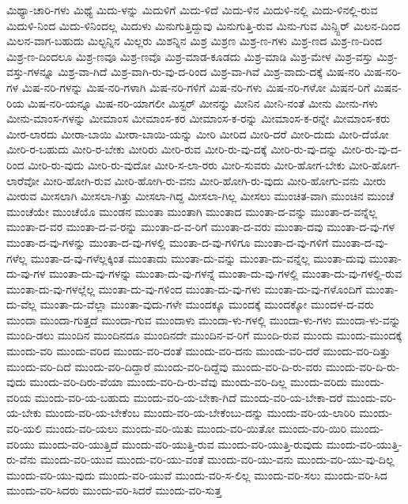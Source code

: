 {ಮಿಥ್ಯಾ-ಚಾರಿ-ಗಳು
ಮಿಥ್ಯೆ
ಮಿದು-ಳನ್ನು
ಮಿದುಳಿಗೆ
ಮಿದು-ಳಿದೆ
ಮಿದು-ಳಿನ
ಮಿದುಳಿ-ನಲ್ಲಿ
ಮಿದು-ಳಿನಲ್ಲಿ-ರುವ
ಮಿದುಳಿ-ನಿಂದ
ಮಿದು-ಳಿನಿಂದಲ್ಲ
ಮಿದುಳು
ಮಿನುಗುತ್ತಿದ್ದುವು
ಮಿನುಗುತ್ತಿ-ರುವ
ಮಿನು-ಗುವ
ಮಿನ್ಸ್ಟಿರ್
ಮಿಲನ-ದಿಂದ
ಮಿಲನ-ವಾಗ-ಬಹುದು
ಮಿಲ್ಟನ್ನಿನ
ಮಿಲ್ಲರು
ಮಿಶನ್ನಿನ
ಮಿಶ್ರ
ಮಿಶ್ರಣ
ಮಿಶ್ರ-ಣ-ಗಳು
ಮಿಶ್ರ-ಣದ
ಮಿಶ್ರ-ಣ-ದಿಂದ
ಮಿಶ್ರ-ಣ-ದಿಂದಲೂ
ಮಿಶ್ರ-ಣವೂ
ಮಿಶ್ರ-ಣವೊ
ಮಿಶ್ರ-ಮಾಡ-ಕೂಡದು
ಮಿಶ್ರ-ಮಾಡಿ
ಮಿಶ್ರ-ಮೇಳ
ಮಿಶ್ರ-ವಸ್ತು
ಮಿಶ್ರ-ವಸ್ತು-ಗಳನ್ನೂ
ಮಿಶ್ರ-ವಾ-ಗಿದೆ
ಮಿಶ್ರ-ವಾಗಿ-ರು-ವು-ದ-ರಿಂದ
ಮಿಶ್ರ-ವಾ-ಗಿವೆ
ಮಿಶ್ರ-ವಾದು-ದಕ್ಕೆ
ಮಿಷ-ನರಿ
ಮಿಷ-ನರಿ-ಗಳ
ಮಿಷ-ನರಿ-ಗಳನ್ನು
ಮಿಷ-ನರಿ-ಗಳಾಗಿ
ಮಿಷ-ನರಿ-ಗಳಿಗೆ
ಮಿಷ-ನರಿ-ಗಳು
ಮಿಷ-ನರಿ-ಗಳೋ
ಮಿಷನ-ರಿಗೆ
ಮಿಷನ-ರಿಯ
ಮಿಷ-ನರಿ-ಯನ್ನೂ
ಮಿಷ-ನರಿ-ಯಾಗಲೀ
ಮಿಸ್ಟರ್
ಮೀನನ್ನು
ಮೀನಿನ
ಮೀನಿ-ನಂತೆ
ಮೀನು
ಮೀನು-ಗಳು
ಮೀನು-ಮಾಂಸ-ಗಳನ್ನು
ಮೀಮಾಂಸ
ಮೀಮಾಂಸ-ಕರ
ಮೀಮಾಂಸ-ಕ-ರನ್ನು
ಮೀಮಾಂಸ-ಕ-ರನ್ನೇ
ಮೀಮಾಂಸ-ಕರು
ಮೀರ-ಲಾರದು
ಮೀರಾ-ಬಾಯಿ
ಮೀರಾ-ಬಾಯಿ-ಯನ್ನು
ಮೀರಿ
ಮೀರಿದ
ಮೀರಿ-ದರೆ
ಮೀರಿ-ದುದು
ಮೀರಿ-ದೆಯೋ
ಮೀರಿ-ರ-ಬಹುದು
ಮೀರಿ-ರ-ಬೇಕು
ಮೀರಿರು
ಮೀರಿ-ರುವ
ಮೀರಿ-ರು-ವು-ದಕ್ಕೆ
ಮೀರಿ-ರು-ವು-ದನ್ನು
ಮೀರಿ-ರು-ವು-ದ-ರಿಂದ
ಮೀರಿ-ರು-ವುದು
ಮೀರಿ-ರು-ವುದೋ
ಮೀರಿ-ಸ-ಲಾ-ರರು
ಮೀರಿ-ಸುವರು
ಮೀರಿ-ಹೋಗ-ಬೇಕು
ಮೀರಿ-ಹೋಗ-ಲಾರೆವೋ
ಮೀರಿ-ಹೋಗಿ-ರುವ
ಮೀರಿ-ಹೋಗಿ-ರು-ವನು
ಮೀರಿ-ಹೋಗಿ-ರು-ವುದು
ಮೀರಿ-ಹೋಗು-ವನು
ಮೀರು
ಮೀರುವ
ಮೀಸಲಾಗಿ
ಮೀಸಲಾ-ಗಿತ್ತು
ಮೀಸಲಾ-ಗಿದ್ದ
ಮೀಸಲಾ-ಗಿಲ್ಲ
ಮೀಸಲು
ಮುಂಚಿತ-ವಾಗಿ
ಮುಂಚಿನ
ಮುಂಚೆ
ಮುಂಚೆಯೇ
ಮುಂಚೆಯೊ
ಮುಂಡನ
ಮುಂತಾ
ಮುಂತಾಗಿ
ಮುಂತಾದ
ಮುಂತಾ-ದ-ವನ್ನು
ಮುಂತಾ-ದ-ವನ್ನೆಲ್ಲ
ಮುಂತಾ-ದ-ವರ
ಮುಂತಾ-ದ-ವ-ರನ್ನು
ಮುಂತಾ-ದ-ವ-ರಿಗೆ
ಮುಂತಾ-ದ-ವರು
ಮುಂತಾ-ದವು
ಮುಂತಾ-ದ-ವು-ಗಳ
ಮುಂತಾ-ದ-ವು-ಗಳನ್ನು
ಮುಂತಾ-ದ-ವು-ಗಳಲ್ಲಿ
ಮುಂತಾ-ದ-ವು-ಗಳಿಗೂ
ಮುಂತಾ-ದ-ವು-ಗಳಿಗೆ
ಮುಂತಾ-ದ-ವು-ಗಳೆಲ್ಲ
ಮುಂತಾ-ದ-ವು-ಗಳೆಲ್ಲಕ್ಕಿಂತ
ಮುಂತಾದು
ಮುಂತಾ-ದು-ವನ್ನು
ಮುಂತಾ-ದು-ವನ್ನೆಲ್ಲ
ಮುಂತಾ-ದುವು
ಮುಂತಾ-ದು-ವು-ಗಳ
ಮುಂತಾ-ದು-ವು-ಗಳನ್ನು
ಮುಂತಾ-ದು-ವು-ಗಳನ್ನೆ
ಮುಂತಾ-ದು-ವು-ಗಳಲ್ಲಿ
ಮುಂತಾ-ದು-ವು-ಗಳಲ್ಲಿ-ರುವ
ಮುಂತಾ-ದು-ವು-ಗಳಲ್ಲೆಲ್ಲ
ಮುಂತಾ-ದು-ವು-ಗಳಿಂದ
ಮುಂತಾ-ದು-ವು-ಗಳು
ಮುಂತಾ-ದು-ವು-ಗಳೊಂದಿಗೆ
ಮುಂತಾ-ದು-ವೆಲ್ಲ
ಮುಂತಾ-ದು-ವೆಲ್ಲಾ
ಮುಂತಾ-ವುದು-ಗಳೇ
ಮುಂದಕ್ಕೂ
ಮುಂದಕ್ಕೆ
ಮುಂದಕ್ಕೋ
ಮುಂದಳ-ದ-ವರು
ಮುಂದಾ
ಮುಂದಾ-ಗುತ್ತದೆ
ಮುಂದಾ-ಗುವ
ಮುಂದಾಳು
ಮುಂದಾ-ಳು-ಗಳಲ್ಲಿ
ಮುಂದಾ-ಳು-ಗಳು
ಮುಂದಾ-ಳು-ವನ್ನು
ಮುಂದಿ-ಡಲು
ಮುಂದಿನ
ಮುಂದಿನದೂ
ಮುಂದಿನದೇ
ಮುಂದಿನ-ವ-ರಿಗೆ
ಮುಂದಿ-ರುವ
ಮುಂದು
ಮುಂದು-ಮುಂದಕ್ಕೆ
ಮುಂದು-ವರಿ
ಮುಂದು-ವರಿದ
ಮುಂದು-ವರಿ-ದಂತೆ
ಮುಂದು-ವರಿ-ದನು
ಮುಂದು-ವರಿ-ದರೆ
ಮುಂದು-ವರಿ-ದಿತ್ತು
ಮುಂದು-ವರಿ-ದಿದೆ
ಮುಂದು-ವರಿ-ದಿದ್ದಾರೆ
ಮುಂದು-ವರಿ-ದಿದ್ದೆವು
ಮುಂದು-ವರಿ-ದಿ-ರು-ವರು
ಮುಂದು-ವರಿ-ದಿ-ರು-ವುದು
ಮುಂದು-ವರಿ-ದಿರು-ವೆಯಾ
ಮುಂದು-ವರಿ-ದಿ-ರು-ವೆವು
ಮುಂದು-ವರಿ-ದಿಲ್ಲ
ಮುಂದು-ವರಿದು
ಮುಂದು-ವರಿಯ
ಮುಂದು-ವರಿ-ಯ-ಬಹುದು
ಮುಂದು-ವರಿ-ಯ-ಬೇಕಾ-ಗಿದೆ
ಮುಂದು-ವರಿ-ಯ-ಬೇಕಾ-ದರೆ
ಮುಂದು-ವರಿ-ಯ-ಬೇಕು
ಮುಂದು-ವರಿ-ಯ-ಬೇಕೆಂಬ
ಮುಂದು-ವರಿ-ಯ-ಬೇಕೆಂಬು-ದನ್ನು
ಮುಂದು-ವರಿ-ಯ-ಲಾರಿರಿ
ಮುಂದು-ವರಿ-ಯಲಿ
ಮುಂದು-ವರಿ-ಯಲು
ಮುಂದು-ವರಿ-ಯಿತು
ಮುಂದು-ವರಿ-ಯಿತೋ
ಮುಂದು-ವರಿ-ಯಿರಿ
ಮುಂದು-ವರಿಯು
ಮುಂದು-ವರಿ-ಯುತ್ತಿದೆ
ಮುಂದು-ವರಿ-ಯುತ್ತಿ-ರುವ
ಮುಂದು-ವರಿ-ಯುತ್ತಿ-ರುವುದು
ಮುಂದು-ವರಿ-ಯುತ್ತಿ-ರು-ವೆನು
ಮುಂದು-ವರಿ-ಯುವ
ಮುಂದು-ವರಿ-ಯು-ವಂತೆ
ಮುಂದು-ವರಿ-ಯು-ವನು
ಮುಂದು-ವರಿ-ಯು-ವು-ದಿಲ್ಲ
ಮುಂದು-ವರಿ-ಯು-ವುದು
ಮುಂದು-ವರಿ-ಯುವೆ
ಮುಂದು-ವರಿ-ಸ-ಲಿಲ್ಲ
ಮುಂದು-ವರಿ-ಸಲು
ಮುಂದು-ವರಿ-ಸಿದ
ಮುಂದು-ವರಿ-ಸಿದರು
ಮುಂದು-ವರಿ-ಸಿದರೆ
ಮುಂದು-ವರಿ-ಸುತ್ತ
}
